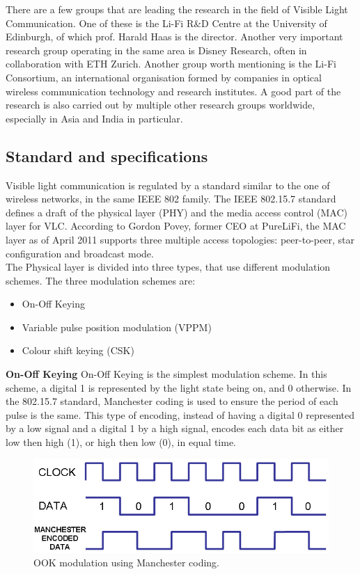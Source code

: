 There are a few groups that are leading the research in the field of Visible Light Communication.
One of these is the Li-Fi R\&D Centre at the University of Edinburgh, of which prof. Harald Haas is the director.
Another very important research group operating in the same area is Disney Research, often in collaboration with ETH Zurich.
Another group worth mentioning is the Li-Fi Consortium, an international organisation formed by companies in optical wireless communication technology and research institutes.
A good part of the research is also carried out by multiple other research groups worldwide, especially in Asia and India in particular.


\subsection{Standard and specifications}
\label{modulschemes}
Visible light communication is regulated by a standard similar to the one of wireless networks, in the same IEEE 802 family.\cite{IEEE}
The IEEE 802.15.7 standard defines a draft of the physical layer (PHY) and the media access control (MAC) layer for VLC. 
According to Gordon Povey, former CEO at PureLiFi\cite{poveyspec}, the MAC layer as of April 2011 supports three multiple access topologies: peer-to-peer, star configuration and broadcast mode.\\
The Physical layer is divided into three types, that use different modulation schemes.
The three modulation schemes are: 
\begin{itemize}
\item On-Off Keying
\item Variable pulse position modulation (VPPM)
\item Colour shift keying (CSK)
\end{itemize}
\textbf{On-Off Keying}\newline
On-Off Keying is the simplest modulation scheme. 
In this scheme, a digital 1 is represented by the light state being on, and 0 otherwise.
In the 802.15.7 standard, Manchester coding is used to ensure the period of each pulse is the same.
This type of encoding, instead of having a digital 0 represented by a low signal and a digital 1 by a high signal, encodes each data bit as either low then high (1), or high then low (0), in equal time.\\
\newline
\begin{figure}[H]
\centering
\includegraphics[scale=0.3]{img/ookmodulation}
\caption{OOK modulation using Manchester coding.}
\label{fig:ookmod}
\end{figure}
